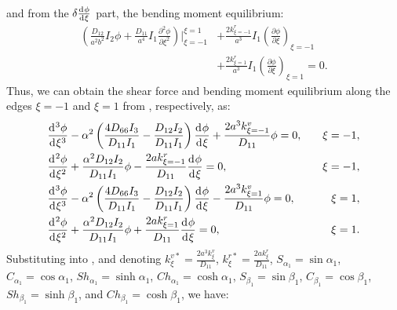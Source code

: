 \documentclass[preprint,12pt]{elsarticle}
\newcommand{\id}{\mathrm{d}\mkern1mu}
\begin{document}
%
and from the \(\delta \frac{\id \phi}{\id \xi}\) part, the bending moment equilibrium:
%
\begin{equation}\label{eq:inertial_forcex2}
	\begin{split}	
		\left( \frac{D_{12}}{a^2b^2} I_2 \phi + \frac{D_{11}}{a^4} I_1 \frac{\partial^2 \phi}{\partial \xi^2} \right) 
		\Big|^{\xi=1}_{\xi=-1} 
		&+ \frac{2k^r_{\xi=-1}}{a^3} I_1 \left(\frac{\partial \phi}{\partial \xi}\right)_{\xi=-1} \\
		&+ \frac{2k^r_{\xi=1}}{a^3} I_1 \left(\frac{\partial \phi}{\partial \xi}\right)_{\xi=1} = 0.
	\end{split}
\end{equation}
%
Thus, we can obtain the shear force and bending moment equilibrium along the edges \(\xi = -1\) and \(\xi = 1\) from , respectively, as:
%
\begin{subequations}\label{eq:boundaryx}
	\begin{align}
		&  \frac{\id^3 \phi}{\id \xi^3} - \alpha^2\left( \frac{4D_{66}I_3}{D_{11}I_1}  - \frac{D_{12}I_2}{D_{11}I_1}  \right) \frac{\id \phi}{\id \xi} 
		+\frac{2a^3k^v_{\xi=-1}}{D_{11}}\phi = 0, \quad &\xi = -1, \\
		& \frac{\id^2 \phi}{\id \xi^2} + \frac{\alpha^2 D_{12} I_2}{D_{11} I_1} \phi - \frac{2a k^r_{\xi=-1}}{D_{11}} \frac{\id \phi}{\id \xi} = 0, \quad &\xi = -1, \\
		& \frac{\id^3 \phi}{\id \xi^3} - \alpha^2\left( \frac{4D_{66}I_3}{D_{11}I_1}  - \frac{D_{12}I_2}{D_{11}I_1}  \right) \frac{\id \phi}{\id \xi} 
		-\frac{2a^3 k^v_{\xi=1}}{D_{11}} \phi = 0, \quad &\xi = 1, \\
		& \frac{\id^2 \phi}{\id \xi^2} + \frac{\alpha^2 D_{12} I_2}{D_{11} I_1} \phi + \frac{2a k^r_{\xi=1}}{D_{11}} \frac{\id \phi}{\id \xi} = 0, \quad &\xi = 1.
	\end{align}
\end{subequations}
%
Substituting  into , and denoting \( k^{v*}_{\xi} = \frac{2a^3 k^v_{\xi}}{D_{11}} \), \( k^{r*}_{\xi} = \frac{2a k^r_{\xi}}{D_{11}} \), \( S_{\alpha_1}=\sin\alpha_1  \), \( C_{\alpha_1}=\cos\alpha_1 \), \( Sh_{\alpha_1}=\sinh\alpha_1 \), \( Ch_{\alpha_1}=\cosh\alpha_1  \), \(S_{\beta_1}= \sin\beta_1 \), \( C_{\beta_1}=\cos\beta_1 \), \( Sh_{\beta_1}=\sinh\beta_1  \), and \(  Ch_{\beta_1}=\cosh\beta_1 \), we have:
%
\end{document}
